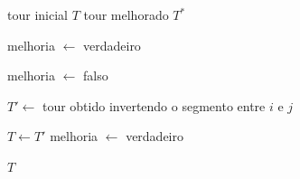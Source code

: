 \begin{algorithm}[H]
\caption{Busca local baseada em inversões para o TSP}
\label{alg:one_opt_tsp}
\begin{algorithmic}[1]
\Require tour inicial $T$
\Ensure tour melhorado $T^{*}$

\State melhoria $\gets$ verdadeiro

    \State melhoria $\gets$ falso


            \State $T' \gets$ tour obtido invertendo o segmento entre $i$ e $j$

                \State $T \gets T'$
                \State melhoria $\gets$ verdadeiro
            \EndIf

        \EndFor
    \EndFor

\EndWhile

\State \Return $T$
\end{algorithmic}
\end{algorithm}